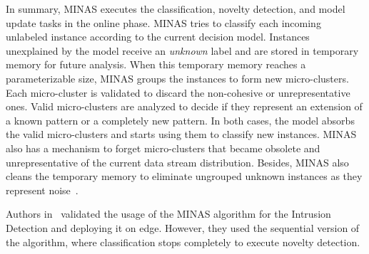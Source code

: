 In summary, MINAS executes the classification, novelty detection, and model update tasks in the online phase.
MINAS tries to classify each incoming unlabeled instance according to the current decision model. Instances unexplained by the model 
receive an \textit{unknown} label and are stored in temporary memory for future analysis. When this temporary memory reaches a parameterizable size, MINAS groups the instances to form new micro-clusters. Each micro-cluster is validated to discard the non-cohesive or unrepresentative ones. Valid micro-clusters are analyzed to decide if they represent an extension of a known pattern or a completely new pattern. In both cases, the model absorbs the valid micro-clusters and starts using them to classify new instances.
MINAS also has a mechanism to forget micro-clusters that became obsolete and unrepresentative of the current data stream distribution. 
Besides, MINAS also cleans the temporary memory to eliminate ungrouped unknown instances as they represent noise~\cite{Faria2016minas}.

Authors in~\cite{Cassales2019a} validated the usage of the MINAS algorithm for the Intrusion Detection and deploying it on edge. However, they used the sequential version of the algorithm, where classification stops completely to execute novelty detection.


